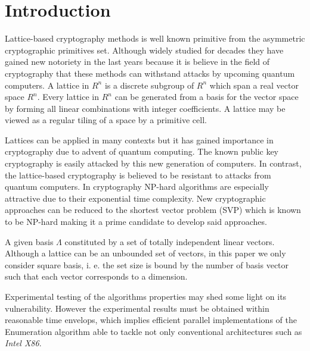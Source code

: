 \documentclass[conference]{IEEEtran}
\begin{document}
\IEEEpeerreviewmaketitle


\section{Introduction}
   Lattice-based cryptography methods is well known primitive from the asymmetric cryptographic primitives set. Although widely studied for decades they have gained new notoriety in the last years because it is believe in the field of cryptography that these methods can withstand attacks by upcoming quantum computers.
    A lattice in $R^n$ is a discrete subgroup of $R^n$ which span a real vector space $R^n$. Every lattice in $R^n$ can be generated from a basis for the vector space by forming all linear combinations with integer coefficients. A lattice may be viewed as a regular tiling of a space by a primitive cell. 

	Lattices can be applied in many contexts but it has gained importance in cryptography due to advent of quantum computing. The known public key cryptography is easily attacked by this new generation of computers. In contrast, the lattice-based cryptography is believed to be resistant to attacks from quantum computers. In cryptography NP-hard algorithms are especially attractive due to their exponential time complexity. New cryptographic approaches can be reduced to the shortest vector problem (SVP) which is known to be NP-hard making it a prime candidate to develop said approaches. 
	
    A given basis $\Lambda$ constituted by a set of totally independent linear vectors. Although a lattice can be an unbounded set  of vectors, in this paper we only consider square basis, i. e. the set size is bound by the number of basis vector such that each vector corresponds to a dimension.
    
    Experimental testing of the algorithms properties may shed some light on its vulnerability. However the experimental results must be obtained  within reasonable time envelops, which implies efficient parallel implementations of the Enumeration algorithm able to tackle not only conventional architectures such as \emph{Intel X86}.
\end{document}
